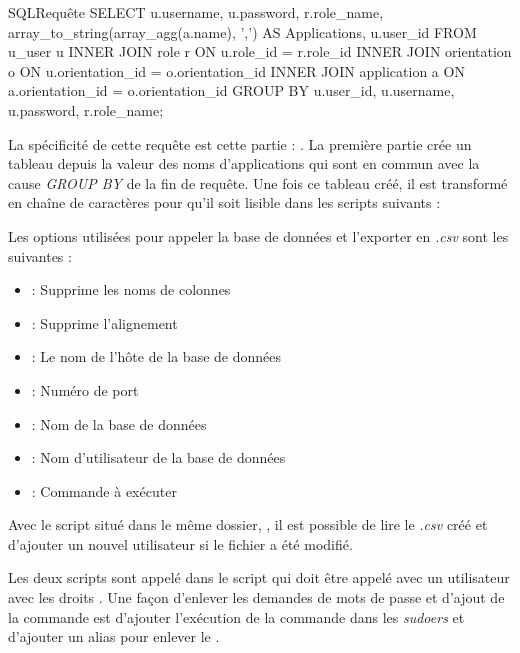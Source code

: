 \begin{listingsbox}{SQL}{Requête}
SELECT u.username, u.password, r.role_name, 
array_to_string(array_agg(a.name), ',') AS Applications, u.user_id 
FROM u_user u INNER JOIN role r ON u.role_id = r.role_id 
INNER JOIN orientation o ON u.orientation_id = o.orientation_id 
INNER JOIN application a ON a.orientation_id = o.orientation_id 
GROUP BY u.user_id, u.username, u.password, r.role_name;
\end{listingsbox}

La spécificité de cette requête est cette partie : . 
La première partie crée un tableau depuis la valeur des noms d'applications qui sont en commun avec la cause \textit{GROUP BY} de la fin de requête.
Une fois ce tableau créé, il est transformé en chaîne de caractères pour qu'il soit lisible dans les scripts suivants : 

Les options utilisées pour appeler la base de données et l'exporter en \textit{.csv} sont les suivantes : 
\begin{itemize}
	\item {} : Supprime les noms de colonnes
	\item {} : Supprime l'alignement
	\item {} : Le nom de l'hôte de la base de données
	\item {} : Numéro de port
	\item {} : Nom de la base de données
	\item {} : Nom d'utilisateur de la base de données
	\item {} : Commande à exécuter
\end{itemize}

Avec le script situé dans le même dossier, , il est possible de lire le \textit{.csv} créé et d'ajouter un nouvel utilisateur si le fichier a été modifié.


Les deux scripts sont appelé dans le script  qui doit être appelé avec un utilisateur avec les droits .
Une façon d'enlever les demandes de mots de passe et d'ajout de la commande  est d'ajouter l'exécution de la commande  dans les \textit{sudoers} et d'ajouter un alias pour enlever le .

